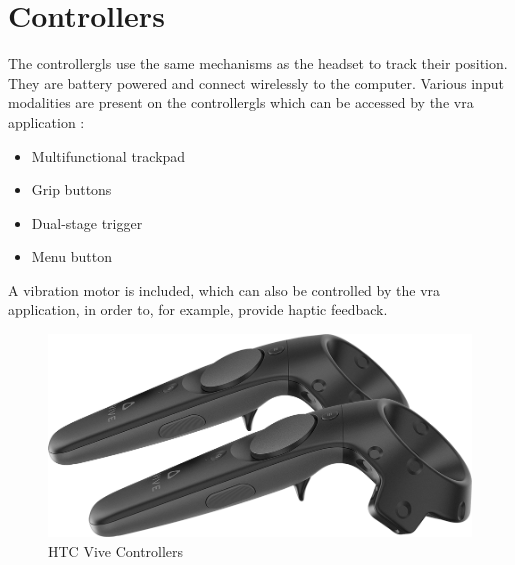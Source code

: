 \section{Controllers}
The \glspl{controllergl} use the same mechanisms as the headset to track their position. They are battery powered and connect wirelessly to the computer. Various input modalities are present on the \glspl{controllergl} which can be accessed by the \gls{vra} application \autocite{viveProductPage}:
\begin{itemize}
    \item Multifunctional trackpad
    \item Grip buttons
    \item Dual-stage trigger
    \item Menu button
\end{itemize}
A vibration motor is included, which can also be controlled by the \gls{vra} application, in order to, for example, provide haptic feedback.
\begin{figure}[h]
    \centering
    \includegraphics[height=0.2\textheight]{figures/vive-hardware-controllers-1}
    \caption{HTC Vive Controllers \autocite{viveProductPage}}
    \label{fig:controllers}
\end{figure}


